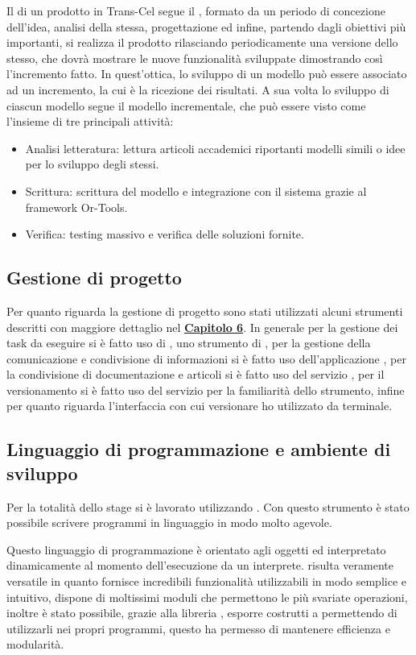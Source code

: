 Il  di un prodotto in Trans-Cel segue il , formato da un periodo di concezione dell'idea, analisi della stessa, progettazione ed infine, partendo dagli obiettivi più importanti, si realizza il prodotto rilasciando periodicamente una versione dello stesso, che dovrà mostrare le nuove funzionalità sviluppate dimostrando così l'incremento fatto. In quest'ottica, lo sviluppo di un modello può essere associato ad un incremento, la cui  è la ricezione dei risultati.
A sua volta lo sviluppo di ciascun modello segue il modello incrementale, che può essere visto come l'insieme di tre principali attività:
\begin{itemize}
	\item Analisi letteratura: lettura articoli accademici riportanti modelli simili o idee per lo sviluppo degli stessi.
	\item Scrittura: scrittura del modello e integrazione con il sistema grazie al framework Or-Tools.
	\item Verifica: testing massivo e verifica delle soluzioni fornite.
\end{itemize}

\subsection{Gestione di progetto}
Per quanto riguarda la gestione di progetto sono stati utilizzati alcuni strumenti descritti con maggiore dettaglio nel \hyperlink{(chap:capitolo6)}{\textbf{Capitolo 6}}. In generale per la gestione dei task da eseguire si è fatto uso di , uno strumento di , per la gestione della comunicazione e condivisione di informazioni si è fatto uso dell'applicazione , per la condivisione di documentazione e articoli si è fatto uso del servizio , per il versionamento si è fatto uso del servizio  per la familiarità dello strumento, infine per quanto riguarda l'interfaccia con cui versionare ho utilizzato  da terminale.
	
\subsection{Linguaggio di programmazione e ambiente di sviluppo}
Per la totalità dello stage si è lavorato utilizzando . Con questo strumento è stato possibile scrivere programmi in linguaggio  in modo molto agevole. 

Questo linguaggio di programmazione è orientato agli oggetti ed interpretato dinamicamente al momento dell'esecuzione da un interprete.  risulta veramente versatile in quanto fornisce incredibili funzionalità utilizzabili in modo semplice e intuitivo, dispone di moltissimi moduli che permettono le più svariate operazioni, inoltre è stato possibile, grazie alla libreria , esporre costrutti  a  permettendo di utilizzarli nei propri programmi, questo ha permesso di mantenere efficienza e modularità.

